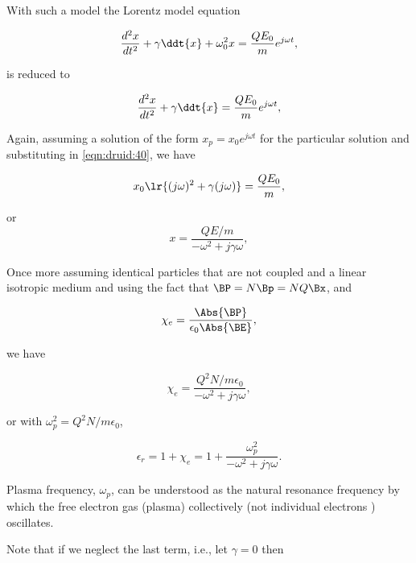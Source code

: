 With such a model the Lorentz model equation

\begin{dmath}\label{eqn:druid:20}
\frac{d^2 x}{dt^2} + \gamma \ddt{x} + \omega_0^2 x = \frac{Q E_0}{m} e^{j \omega t},
\end{dmath}

is reduced to

\begin{dmath}\label{eqn:druid:40}
\frac{d^2 x}{dt^2} + \gamma \ddt{x} = \frac{Q E_0}{m} e^{j \omega t},
\end{dmath}

Again, assuming a solution of the form \( x_p = x_0 e^{j \omega t} \) for the particular solution and substituting in \cref{eqn:druid:40}, we have

\begin{dmath}\label{eqn:druid:80}
x_0 \lr{ (j\omega)^2 + \gamma (j \omega)} = \frac{Q E_0}{m},
\end{dmath}

or
\begin{dmath}\label{eqn:druid:60}
x 
= 
\frac{Q E/m}{-\omega^2 + j \gamma \omega },
\end{dmath}

Once more assuming identical particles that are not coupled and a linear isotropic medium and using the fact that \( \BP = N \Bp = N Q \Bx \), and

\begin{dmath}\label{eqn:druid:100}
\chi_e = \frac{\Abs{\BP}}{\epsilon_0 \Abs{\BE} }, 
\end{dmath}

we have

\begin{dmath}\label{eqn:druid:120}
\chi_e 
=
\frac{Q^2 N/m \epsilon_0}{-\omega^2 + j \gamma \omega },
\end{dmath}

or with \( \omega_p^2 = Q^2 N/m\epsilon_0\),

\begin{dmath}\label{eqn:druid:140}
\epsilon_r 
= 1 + \chi_e 
= 
1+
\frac{\omega_p^2}{-\omega^2 + j \gamma \omega }.
\end{dmath}

Plasma frequency, \( \omega_p \), can be understood as the natural resonance frequency by which the free electron gas (plasma) collectively (not individual electrons ) oscillates.

Note that if we neglect the last term, i.e., let \( \gamma = 0 \) then


